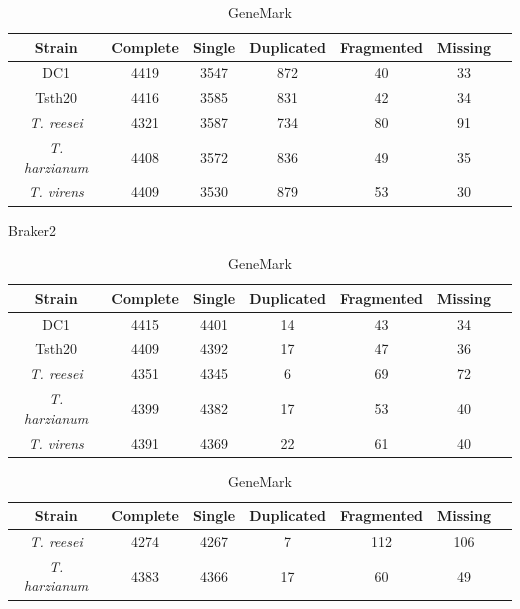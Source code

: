 \begin{table}
  \begin{center}
    \begin{subtable}{\textwidth}
      \centering
      \begin{tabular}{|c|c|c|c|c|c|c|}
        \hline
        Strain & Complete & Single & Duplicated & Fragmented & Missing \\ \hline
        DC1 & 4419 & 3547 & 872 & 40 & 33 \\ \hline
        Tsth20 & 4416 & 3585 & 831 & 42 & 34 \\ \hline
        \textit{T. reesei} & 4321 & 3587 & 734 & 80 & 91 \\ \hline
        \textit{T. harzianum} & 4408 & 3572 & 836 & 49 & 35 \\ \hline
        \textit{T. virens} & 4409 & 3530 & 879 & 53 & 30 \\ \hline
      \end{tabular}
      \caption{Braker2}
      \vspace{0.5cm}
    \end{subtable}
    \begin{subtable}{\textwidth}
      \centering
      \begin{tabular}{|c|c|c|c|c|c|c|}
        \hline
        Strain & Complete & Single & Duplicated & Fragmented & Missing \\ \hline
        DC1 & 4415 & 4401 & 14 & 43 & 34 \\ \hline
        Tsth20 & 4409 & 4392 & 17 & 47 & 36 \\ \hline
        \textit{T. reesei} & 4351 & 4345 & 6 & 69 & 72 \\ \hline
        \textit{T. harzianum} & 4399 & 4382 & 17 & 53 & 40 \\ \hline
        \textit{T. virens} & 4391 & 4369 & 22 & 61 & 40 \\ \hline
      \end{tabular}
      \caption{GeneMark}
      \vspace{0.5cm}
    \end{subtable}
    \begin{subtable}{\textwidth}
      \centering
      \begin{tabular}{|c|c|c|c|c|c|c|}
        \hline
        Strain & Complete & Single & Duplicated & Fragmented & Missing \\ \hline
        \textit{T. reesei} & 4274 & 4267 & 7 & 112 & 106 \\ \hline
        \textit{T. harzianum} & 4383 & 4366 & 17 & 60 & 49 \\ \hline

\end{tabular}
\end{subtable}
\end{center}
\end{table}
